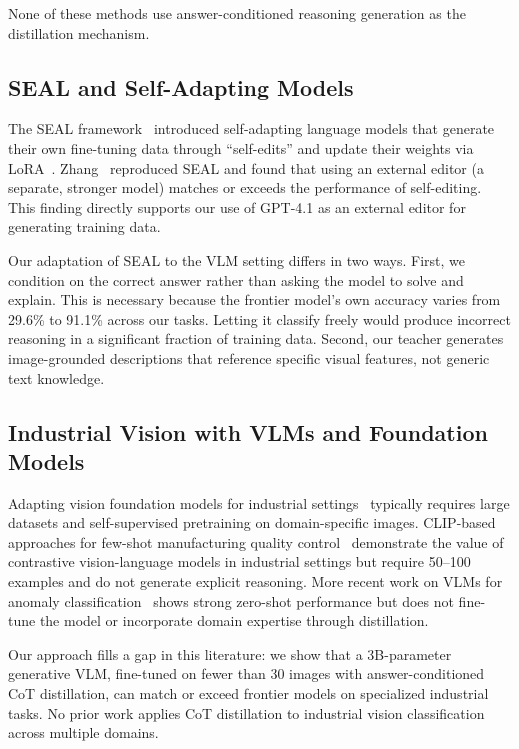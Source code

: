 \documentclass{bmvc2k}
\begin{document}
None of these methods use answer-conditioned reasoning generation as the distillation mechanism.

\subsection{SEAL and Self-Adapting Models}

The SEAL framework~\cite{zweiger2025seal} introduced self-adapting language models that generate their own fine-tuning data through ``self-edits'' and update their weights via LoRA~\cite{hu2021lora}. Zhang~\cite{zhang2025seal} reproduced SEAL and found that using an external editor (a separate, stronger model) matches or exceeds the performance of self-editing. This finding directly supports our use of GPT-4.1 as an external editor for generating training data.

Our adaptation of SEAL to the VLM setting differs in two ways. First, we condition on the correct answer rather than asking the model to solve and explain. This is necessary because the frontier model's own accuracy varies from 29.6\% to 91.1\% across our tasks. Letting it classify freely would produce incorrect reasoning in a significant fraction of training data. Second, our teacher generates image-grounded descriptions that reference specific visual features, not generic text knowledge.

\subsection{Industrial Vision with VLMs and Foundation Models}

Adapting vision foundation models for industrial settings~\cite{adapting2024industry} typically requires large datasets and self-supervised pretraining on domain-specific images. CLIP-based approaches for few-shot manufacturing quality control~\cite{clip2025fewshot} demonstrate the value of contrastive vision-language models in industrial settings but require 50--100 examples and do not generate explicit reasoning. More recent work on VLMs for anomaly classification~\cite{vlm2026anomaly} shows strong zero-shot performance but does not fine-tune the model or incorporate domain expertise through distillation.

Our approach fills a gap in this literature: we show that a 3B-parameter generative VLM, fine-tuned on fewer than 30 images with answer-conditioned CoT distillation, can match or exceed frontier models on specialized industrial tasks. No prior work applies CoT distillation to industrial vision classification across multiple domains.
\end{document}
